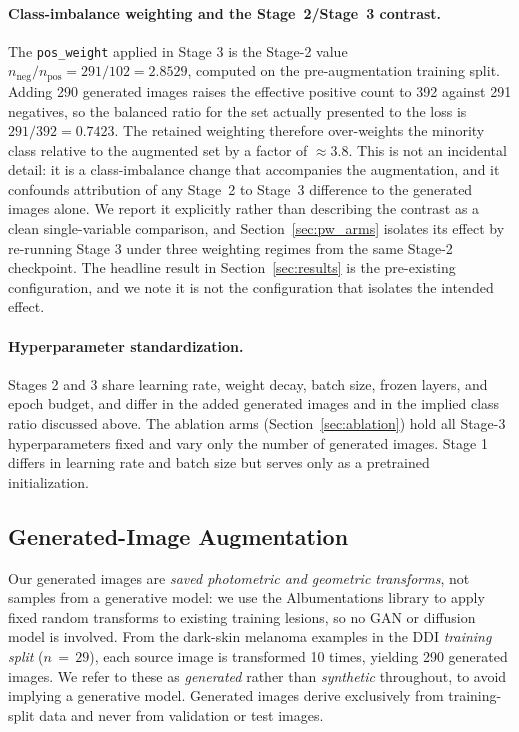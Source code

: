 \paragraph{Class-imbalance weighting and the Stage~2/Stage~3 contrast.}
The \texttt{pos\_weight} applied in Stage 3 is the Stage-2 value $n_{\text{neg}} / n_{\text{pos}} = 291 / 102 = 2.8529$, computed on the pre-augmentation training split. Adding 290 generated images raises the effective positive count to 392 against 291 negatives, so the balanced ratio for the set actually presented to the loss is $291/392 = 0.7423$. The retained weighting therefore over-weights the minority class relative to the augmented set by a factor of $\approx 3.8$. This is not an incidental detail: it is a class-imbalance change that accompanies the augmentation, and it confounds attribution of any Stage~2 to Stage~3 difference to the generated images alone. We report it explicitly rather than describing the contrast as a clean single-variable comparison, and Section~\ref{sec:pw_arms} isolates its effect by re-running Stage 3 under three weighting regimes from the same Stage-2 checkpoint. The headline result in Section~\ref{sec:results} is the pre-existing configuration, and we note it is not the configuration that isolates the intended effect.

\paragraph{Hyperparameter standardization.}
Stages 2 and 3 share learning rate, weight decay, batch size, frozen layers, and epoch budget, and differ in the added generated images and in the implied class ratio discussed above. The ablation arms (Section~\ref{sec:ablation}) hold all Stage-3 hyperparameters fixed and vary only the number of generated images. Stage 1 differs in learning rate and batch size but serves only as a pretrained initialization.

\subsection{Generated-Image Augmentation}
\label{sec:synthetic_aug}

Our generated images are \emph{saved photometric and geometric transforms}, not samples from a generative model: we use the Albumentations library \cite{Buslaev2020} to apply fixed random transforms to existing training lesions, so no GAN or diffusion model is involved. From the dark-skin melanoma examples in the DDI \emph{training split} ($n\,{=}\,29$), each source image is transformed 10 times, yielding 290 generated images. We refer to these as \emph{generated} rather than \emph{synthetic} throughout, to avoid implying a generative model. Generated images derive exclusively from training-split data and never from validation or test images.

